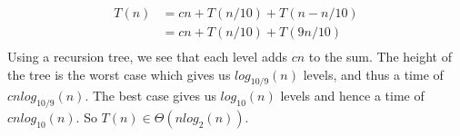 \documentclass[10pt,oneside,reqno]{amsart}
\theoremstyle{plain}
\theoremstyle{definition}
\begin{document}
\begin{enumerate}[label=\arabic*.]
\begin{equation}
\begin{aligned}
T(n) &= cn + T(n/10) + T(n - n/10)\\
&= cn + T(n/10) + T(9n/10)\\
\end{aligned}
\end{equation}
Using a recursion tree, we see that each level adds $cn$ to the sum. The height of the tree is the worst case which gives us $log_{10/9}(n)$ levels, and thus a time of $cnlog_{10/9}(n)$. The best case gives us $log_{10}(n)$ levels and hence a time of $cnlog_{10}(n)$. So $T(n) \in \Theta(nlog_2(n))$. 







 







\end{enumerate}
\end{document}
